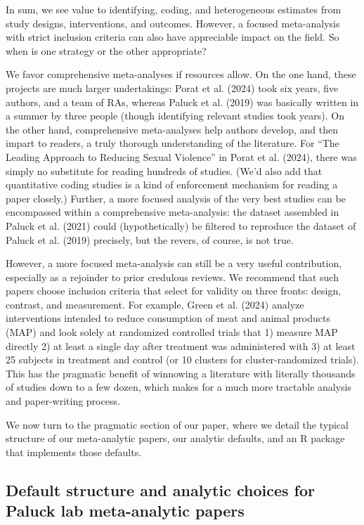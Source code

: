 \documentclass[
  man]{apa6}
\begin{document}
In sum, we see value to identifying, coding, and heterogeneous estimates from study designs, interventions, and outcomes. However, a focused meta-analysis with strict inclusion criteria can also have appreciable impact on the field. So when is one strategy or the other appropriate?

We favor comprehensive meta-analyses if resources allow. On the one hand, these projects are much larger undertakings: Porat et al. (2024) took six years, five authors, and a team of RAs, whereas Paluck et al. (2019) was basically written in a summer by three people (though identifying relevant studies took years). On the other hand, comprehensive meta-analyses help authors develop, and then impart to readers, a truly thorough understanding of the literature. For ``The Leading Approach to Reducing Sexual Violence'' in Porat et al. (2024), there was simply no substitute for reading hundreds of studies. (We'd also add that quantitative coding studies is a kind of enforcement mechanism for reading a paper closely.) Further, a more focused analysis of the very best studies can be encompassed within a comprehensive meta-analysis: the dataset assembled in Paluck et al. (2021) could (hypothetically) be filtered to reproduce the dataset of Paluck et al. (2019) precisely, but the revers, of course, is not true.

However, a more focused meta-analysis can still be a very useful contribution, especially as a rejoinder to prior credulous reviews. We recommend that such papers choose inclusion criteria that select for validity on three fronts: design, contrast, and measurement. For example, Green et al. (2024) analyze interventions intended to reduce consumption of meat and animal products (MAP) and look solely at randomized controlled trials that 1) measure MAP directly 2) at least a single day after treatment was administered with 3) at least 25 subjects in treatment and control (or 10 clusters for cluster-randomized trials). This has the pragmatic benefit of winnowing a literature with literally thousands of studies down to a few dozen, which makes for a much more tractable analysis and paper-writing process.

We now turn to the pragmatic section of our paper, where we detail the typical structure of our meta-analytic papers, our analytic defaults, and an R package that implements those defaults.

\subsection{Default structure and analytic choices for Paluck lab meta-analytic papers}\label{default-structure-and-analytic-choices-for-paluck-lab-meta-analytic-papers}
\end{document}
